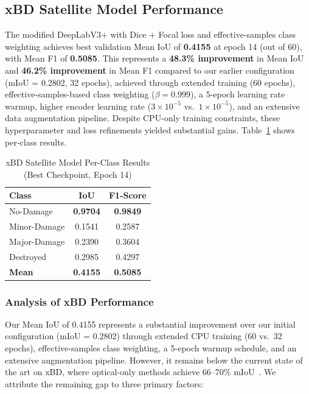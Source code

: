 \documentclass[journal]{IEEEtran}
\begin{document}
\subsection{xBD Satellite Model Performance}

The modified DeepLabV3+ with Dice + Focal loss and effective-samples class weighting achieves best validation Mean IoU of \textbf{0.4155} at epoch 14 (out of 60), with Mean F1 of \textbf{0.5085}. This represents a \textbf{48.3\% improvement} in Mean IoU and \textbf{46.2\% improvement} in Mean F1 compared to our earlier configuration (mIoU = 0.2802, 32 epochs), achieved through extended training (60 epochs), effective-samples-based class weighting ($\beta = 0.999$), a 5-epoch learning rate warmup, higher encoder learning rate ($3 \times 10^{-5}$ vs.\ $1 \times 10^{-5}$), and an extensive data augmentation pipeline. Despite CPU-only training constraints, these hyperparameter and loss refinements yielded substantial gains. Table~\ref{tab:xbd_results} shows per-class results.

\begin{table}[!t]
\centering
\caption{xBD Satellite Model Per-Class Results (Best Checkpoint, Epoch 14)}
\label{tab:xbd_results}
\begin{tabular}{lcc}
\toprule
\textbf{Class} & \textbf{IoU} & \textbf{F1-Score} \\
\midrule
No-Damage & \textbf{0.9704} & \textbf{0.9849} \\
Minor-Damage & 0.1541 & 0.2587 \\
Major-Damage & 0.2390 & 0.3604 \\
Destroyed & 0.2985 & 0.4297 \\
\midrule
\textbf{Mean} & \textbf{0.4155} & \textbf{0.5085} \\
\bottomrule
\end{tabular}
\end{table}

\subsubsection{Analysis of xBD Performance}

Our Mean IoU of 0.4155 represents a substantial improvement over our initial configuration (mIoU = 0.2802) through extended CPU training (60 vs.\ 32 epochs), effective-samples class weighting, a 5-epoch warmup schedule, and an extensive augmentation pipeline. However, it remains below the current state of the art on xBD, where optical-only methods achieve 66--70\% mIoU~\cite{benson2025xbdsota}. We attribute the remaining gap to three primary factors:
\end{document}
